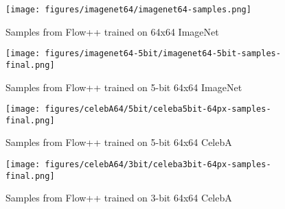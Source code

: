 \documentclass{article}
\begin{document}
\begin{figure*}[]
\begin{center}
\texttt{[image: figures/imagenet64/imagenet64-samples.png]}
\end{center}
\caption{Samples from Flow++ trained on 64x64 ImageNet}
\end{figure*}

\begin{figure*}[]
\begin{center}
\texttt{[image: figures/imagenet64-5bit/imagenet64-5bit-samples-final.png]}
\end{center}
\caption{Samples from Flow++ trained on 5-bit 64x64 ImageNet}
\end{figure*}

\begin{figure*}[]
\begin{center}
\texttt{[image: figures/celebA64/5bit/celeba5bit-64px-samples-final.png]}
\end{center}
\caption{Samples from Flow++ trained on 5-bit 64x64 CelebA}
\end{figure*}

\begin{figure*}[]
\begin{center}
\texttt{[image: figures/celebA64/3bit/celeba3bit-64px-samples-final.png]}
\end{center}
\caption{Samples from Flow++ trained on 3-bit 64x64 CelebA}
\end{figure*}
\clearpage{}
\end{document}
